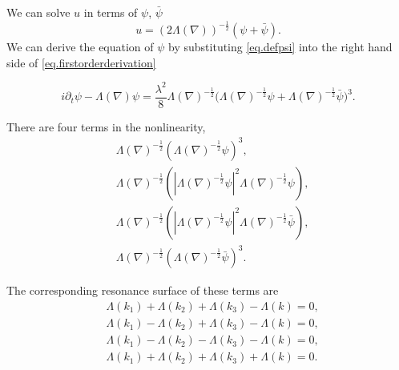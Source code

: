 We can solve $u$ in terms of $\psi$, $\bar{\psi}$
\begin{equation}\label{eq.defpsi}
    u=(2\Lambda(\nabla))^{-\frac{1}{2}}(\psi+\bar{\psi}).
\end{equation} 
We can derive the equation of $\psi$ by substituting \eqref{eq.defpsi} into the right hand side of \eqref{eq.firstorderderivation}

\begin{equation}\label{eq.firstorder}
    i\partial_t\psi-\Lambda(\nabla)\psi=\frac{\lambda^2}{8} \Lambda(\nabla)^{-\frac{1}{2}}\Big(\Lambda(\nabla)^{-\frac{1}{2}}\psi+\Lambda(\nabla)^{-\frac{1}{2}}\bar{\psi}\Big)^3.
\end{equation} 

There are four terms in the nonlinearity, 
\begin{equation}
    \begin{split}
        &\Lambda(\nabla)^{-\frac{1}{2}}(\Lambda(\nabla)^{-\frac{1}{2}}\psi)^3,
        \\
        &\Lambda(\nabla)^{-\frac{1}{2}}(|\Lambda(\nabla)^{-\frac{1}{2}}\psi|^2\Lambda(\nabla)^{-\frac{1}{2}}\psi),
        \\
        &\Lambda(\nabla)^{-\frac{1}{2}}(|\Lambda(\nabla)^{-\frac{1}{2}}\psi|^2\Lambda(\nabla)^{-\frac{1}{2}}\bar{\psi}),
        \\
        &\Lambda(\nabla)^{-\frac{1}{2}}(\Lambda(\nabla)^{-\frac{1}{2}}\bar{\psi})^3.
    \end{split}
\end{equation}

The corresponding resonance surface of these terms are 
\begin{equation}
    \begin{split}
        &\Lambda(k_1)+ \Lambda(k_2)+\Lambda(k_3)-\Lambda(k)=0,
        \\
        &\Lambda(k_1)- \Lambda(k_2)+\Lambda(k_3)-\Lambda(k)=0,
        \\
        &\Lambda(k_1)- \Lambda(k_2)-\Lambda(k_3)-\Lambda(k)=0,
        \\
        &\Lambda(k_1)+ \Lambda(k_2)+\Lambda(k_3)+\Lambda(k)=0.
    \end{split}
\end{equation}



